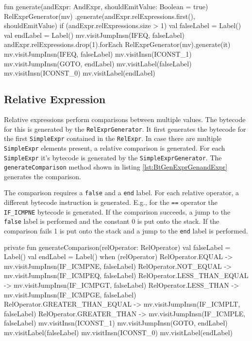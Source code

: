 \begin{KotlinCode}[float,numbers=none,caption=Implementation of the \texttt{generate} method of the \texttt{AndExprGenerator}., label=lst:BtGenExprGenandExpr]
fun generate(andExpr: AndExpr, shouldEmitValue: Boolean = true) {
    RelExprGenerator(mv)
        .generate(andExpr.relExpressions.first(), shouldEmitValue)
    if (andExpr.relExpressions.size > 1) {
        val falseLabel = Label()
        val endLabel = Label()
        mv.visitJumpInsn(IFEQ, falseLabel)
        andExpr.relExpressions.drop(1).forEach {
            RelExprGenerator(mv).generate(it)
            mv.visitJumpInsn(IFEQ, falseLabel)
        }
        mv.visitInsn(ICONST_1)
        mv.visitJumpInsn(GOTO, endLabel)
        mv.visitLabel(falseLabel)
        mv.visitInsn(ICONST_0)
        mv.visitLabel(endLabel)
    }
}
\end{KotlinCode}

\subsection{Relative Expression}

Relative expressions perform comparisons between multiple values. The bytecode for this is generated by the \verb|RelExprGenerator|. It first generates the bytecode for the first \verb|SimpleExpr| contained in the \verb|RelExpr|. In case there are multiple \verb|SimpleExpr| elements present, a relative comparison is generated. For each \verb|SimpleExpr| it's bytecode is generated by the \verb|SimpleExprGenerator|. The \verb|generateComparison| method shown in listing \ref{lst:BtGenExprGenandExpr} generates the comparison. 

The comparison requires a \verb|false| and a \verb|end| label. For each relative operator, a different bytecode instruction is generated. E.g., for the \verb|==| operator the \verb|IF_ICMPNE| bytecode is generated. If the comparison succeeds, a jump to the \verb|false| label is performed and the constant 0 is put onto the stack. If the comparison fails 1 is put onto the stack and a jump to the \verb|end| label is performed. 

\begin{KotlinCode}[float,numbers=none,caption=Implementation of the \texttt{generateComparison} method of the \texttt{RelExprGenerator}., label=lst:BtGenExprGenandExpr]
private fun generateComparison(relOperator: RelOperator) {
    val falseLabel = Label()
    val endLabel = Label()
    when (relOperator) {
        RelOperator.EQUAL -> mv.visitJumpInsn(IF_ICMPNE, falseLabel)
        RelOperator.NOT_EQUAL -> mv.visitJumpInsn(IF_ICMPEQ, falseLabel)
        RelOperator.LESS_THAN_EQUAL -> mv.visitJumpInsn(IF_ICMPGT, falseLabel)
        RelOperator.LESS_THAN -> mv.visitJumpInsn(IF_ICMPGE, falseLabel)
        RelOperator.GREATER_THAN_EQUAL -> mv.visitJumpInsn(IF_ICMPLT, falseLabel)
        RelOperator.GREATER_THAN -> mv.visitJumpInsn(IF_ICMPLE, falseLabel)
    }
    mv.visitInsn(ICONST_1)
    mv.visitJumpInsn(GOTO, endLabel)
    mv.visitLabel(falseLabel)
    mv.visitInsn(ICONST_0)
    mv.visitLabel(endLabel)
}
\end{KotlinCode}


